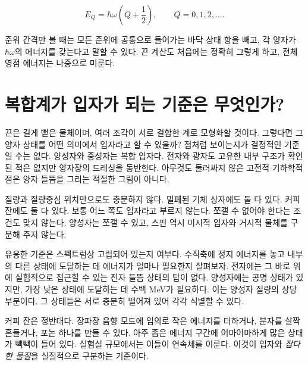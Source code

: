 \begin{equation}
  E_Q=\hbar\omega\left(Q+\frac12\right),
  \qquad Q=0,1,2,\ldots .
  \label{eq:l02-oscillator-spectrum}
\end{equation}

준위 간격만 볼 때는 모든 준위에 공통으로 들어가는 바닥 상태 항을 빼고, 각 양자가 \(\hbar\omega\)의 에너지를 갖는다고 말할 수 있다. 끈 계산도 처음에는 정확히 그렇게 하고, 전체 영점 에너지는 나중으로 미룬다.

\begin{classroomqa}
\end{classroomqa}

\section{복합계가 입자가 되는 기준은 무엇인가?}

끈은 길게 뻗은 물체이며, 여러 조각이 서로 결합한 계로 모형화할 것이다. 그렇다면 그 양자 상태를 어떤 의미에서 입자라고 할 수 있을까? 점처럼 보이는지가 결정적인 기준일 수는 없다. 양성자와 중성자는 복합 입자다. 전자와 광자도 고유한 내부 구조가 확인된 적은 없지만 양자장의 드레싱을 동반한다. 아무것도 둘러싸지 않은 고전적 기하학적 점은 양자 들뜸을 그리는 적절한 그림이 아니다.

질량과 질량중심 위치만으로도 충분하지 않다. 밀폐된 기체 상자에도 둘 다 있다. 커피 잔에도 둘 다 있다. 보통 어느 쪽도 입자라고 부르지 않는다. 쪼갤 수 없어야 한다는 조건도 맞지 않는다. 양성자는 쪼갤 수 있고, 스핀 역시 미시적 입자와 거시적 물체를 구분해 주지 않는다.

유용한 기준은 스펙트럼상 고립되어 있는지 여부다. 수직축에 정지 에너지를 놓고 내부의 다른 상태에 도달하는 데 에너지가 얼마나 필요한지 살펴보자. 전자에는 그 바로 위에 실험적으로 접근할 수 있는 전자 들뜸 상태의 탑이 없다. 양성자에는 공명 상태가 있지만, 가장 낮은 상태에 도달하는 데 수백 MeV가 필요하다. 이는 양성자 질량의 상당 부분이다. 그 상태들은 서로 충분히 떨어져 있어 각각 식별할 수 있다.

커피 잔은 정반대다. 장파장 음향 모드에 임의로 작은 에너지를 더하거나, 분자를 살짝 흔들거나, 포논 하나를 만들 수 있다. 아주 좁은 에너지 구간에 어마어마하게 많은 상태가 빽빽이 들어 있다. 실험실 규모에서는 이들이 연속체를 이룬다. 이것이 입자와 \emph{잡다한 물질}을 실질적으로 구분하는 기준이다.

